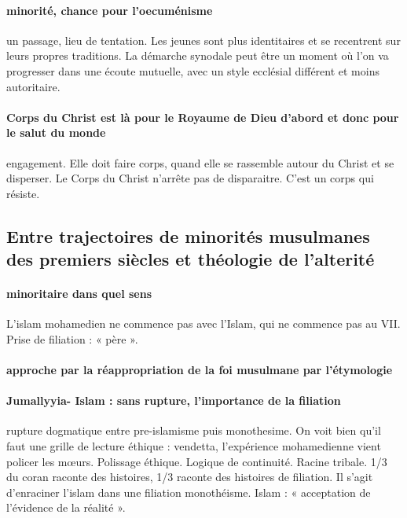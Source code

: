 \paragraph{minorité, chance pour l’oecuménisme} un passage, lieu de tentation. Les jeunes sont plus identitaires et se recentrent sur leurs propres traditions. La démarche synodale peut être un moment où l’on va progresser dans une écoute mutuelle, avec un style ecclésial différent et moins autoritaire. 

\paragraph{Corps du Christ est là pour le Royaume de Dieu d’abord et donc pour le salut du monde} engagement. Elle doit faire corps, quand elle se rassemble autour du Christ et se disperser. Le Corps du Christ n’arrête pas de disparaitre.  C’est un corps qui résiste. 
\subsection{Entre trajectoires de minorités musulmanes des premiers siècles et théologie de l’alterité}

\paragraph{minoritaire dans quel sens} L’islam mohamedien ne commence pas avec l’Islam, qui ne commence pas au VII. Prise de filiation : « père ». 

\paragraph{approche par la réappropriation de la foi musulmane par l’étymologie}
\paragraph{Jumallyyia- Islam : sans rupture, l’importance de la filiation} rupture dogmatique entre pre-islamisme puis monothesime. On voit bien qu’il faut une grille de lecture éthique : vendetta, l’expérience mohamedienne vient policer les mœurs. Polissage éthique. Logique de continuité. Racine tribale. 1/3 du coran raconte des histoires, 1/3 raconte des histoires de filiation. Il s’agit d’enraciner l’islam dans une filiation monothéisme. 
Islam : « acceptation de l’évidence de la réalité ». 

